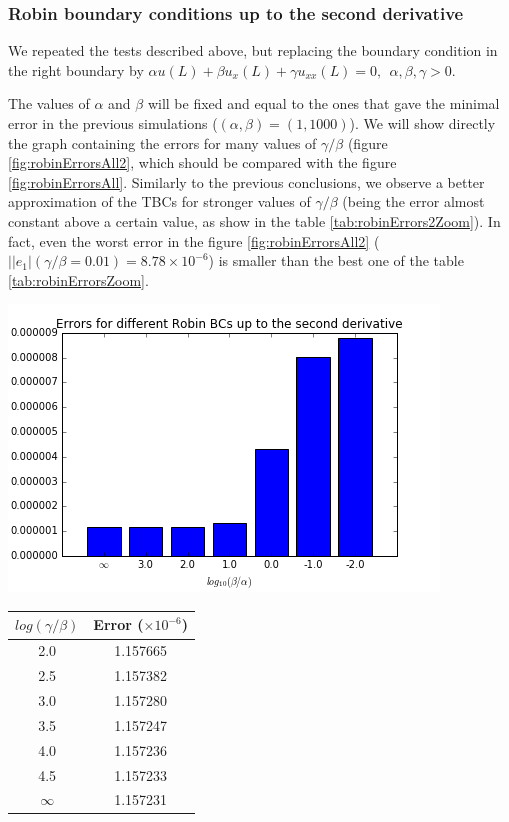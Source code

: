 \subsubsection{Robin boundary conditions up to the second derivative}

\indent We repeated the tests described above, but replacing the boundary condition in the right boundary by $\alpha u(L) + \beta u_x(L) + \gamma u_{xx}(L) = 0,  \ \ \alpha,\beta, \gamma > 0$.

\indent The values of $\alpha$ and $\beta$ will be fixed and equal to the ones that gave the minimal error in the previous simulations ($(\alpha,\beta) = (1,1000)$). We will show directly the graph containing the errors for many values of $\gamma/\beta$ (figure \ref{fig:robinErrorsAll2}, which should be compared with the figure \ref{fig:robinErrorsAll}. Similarly to the previous conclusions, we observe a better approximation of the TBCs for stronger values of $\gamma/\beta$ (being the error almost constant above a certain value, as show in the table \ref{tab:robinErrors2Zoom}). In fact, even the worst error in the figure \ref{fig:robinErrorsAll2} ($||e_1|(\gamma/\beta = 0.01) = 8.78 \times 10^{-6}$) is smaller than the best one of the table \ref{tab:robinErrorsZoom}.

\begin{center}
		\includegraphics[scale=.6]{figures/robinErrors2.png}
\end{center}

\begin{center}
		\begin{tabular}{c|c}
			$log(\gamma/\beta)$ & Error ($\times 10^{-6}$) \\
			\hline
			2.0 & 1.157665\\
			2.5 & 1.157382\\
			3.0 & 1.157280\\
			3.5 & 1.157247\\
			4.0 & 1.157236\\
			4.5 & 1.157233\\
			$\infty$ & 1.157231	
		\end{tabular}
\end{center}

